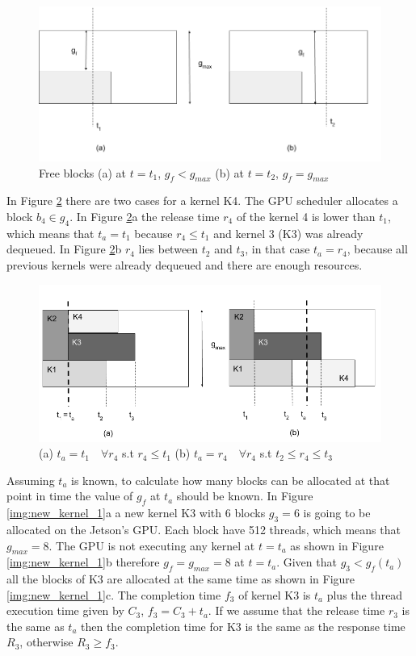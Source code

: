 \documentclass[
  12pt,
  a4paperpaper,
]{report}
\begin{document}
\begin{figure}
\centering
\includegraphics{source/figures/free_blocks.png}
\caption{Free blocks (a) at \(t=t_1\), \(g_f < g_{max}\) (b) at
\(t=t_2\), \(g_f = g_{max}\) \label{img:free_blocks}}
\end{figure}

In Figure \ref{img:ta_example} there are two cases for a kernel K4. 
The GPU scheduler allocates a block \(b_4 \in g_4\). In
Figure \ref{img:ta_example}a the release time \(r_4\) of the kernel 4 is
lower than \(t_1\), which means that \(t_a = t_1\) because
\(r_4 \leq t_1\) and kernel 3 (K3) was already dequeued. In Figure
\ref{img:ta_example}b \(r_4\) lies between \(t_2\) and \(t_3\), in that
case \(t_a = r_4\), because all previous kernels were already dequeued
and there are enough resources.

\begin{figure}
\centering
\includegraphics{source/figures/ta_example.png}
\caption{(a) \(t_a=t_1 \quad \forall r_4\) s.t \(r_4 \leq t_1\) (b)
\(t_a=r_4 \quad \forall r_4\) s.t \(t_2 \leq r_4 \leq t_3\)
\label{img:ta_example}}
\end{figure}

Assuming \(t_a\) is known, to calculate how many blocks
can be allocated at that point in time the value of \(g_f\) at \(t_a\) should be known.
In Figure \ref{img:new_kernel_1}a a new
kernel K3 with 6 blocks \(g_3 = 6\) is going to be allocated on the
Jetson's GPU. Each block have 512 threads, which means that
\(g_{max} = 8\). The GPU is not executing any kernel at \(t=t_a\) as
shown in Figure \ref{img:new_kernel_1}b therefore \(g_f = g_{max} = 8\)
at \(t=t_a\). Given that \(g_3 < g_f(t_a)\) all the blocks of K3 are
allocated at the same time as shown in Figure \ref{img:new_kernel_1}c. 
The completion time \(f_3\) of kernel K3 is \(t_a\) plus the thread
execution time given by \(C_3\), \(f_3 = C_3 + t_a\). If we assume that
the release time \(r_3\) is the same as \(t_a\) then the completion time
for K3 is the same as the response time \(R_3\), otherwise
\(R_3 \geq f_3\).
\end{document}
